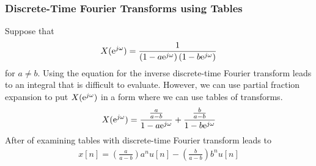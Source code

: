 \documentclass[mathserif,9pt,handout]{beamer}
\begin{document}
\begin{frame}\frametitle{Discrete-Time Fourier Transforms using Tables}\small
  Suppose that 
  \begin{align}
    X({\textrm{e}}^{j\omega}) = \frac{1}{\left(1 - a {\textrm{e}}^{j\omega}\right)\left(1 - b {\textrm{e}}^{j\omega}\right)} \nonumber
  \end{align}
  for $a \neq b$. Using the equation for the inverse discrete-time Fourier transform leads to an integral that is difficult to evaluate. However, we can use partial fraction expansion to put $X({\textrm{e}}^{j\omega})$ in a form where we can use tables of transforms. 
  \begin{align}
    X({\textrm{e}}^{j\omega}) = \frac{\frac{a}{a-b}}{1 - a {\textrm{e}}^{j\omega}} + \frac{\frac{b}{a-b}}{1 - b {\textrm{e}}^{j\omega}} \nonumber
  \end{align}
  After of examining tables with discrete-time Fourier transform leads to
  \begin{align}
    x[n] = \left( \frac{a}{a-b} \right) a^n u[n] - \left( \frac{b}{a-b} \right) b^n u[n]
    \nonumber
  \end{align}
\end{frame}
\end{document}
